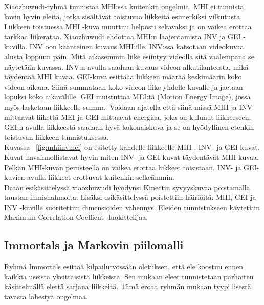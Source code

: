 Xiaozhuwudi-ryhmä tunnistaa MHI:ssa kuitenkin ongelmia. MHI ei tunnista kovin hyvin eleitä, jotka sisältävät toistuvaa liikkeitä esimerkiksi vilkutusta.
Liikkeen toistuessa MHI -kuva muuttuu helposti sekavaksi ja on vaikea erottaa tarkkaa liikerataa. Xiaozhuwudi ehdottaa MHI:n laajentamista INV ja GEI -kuvilla.
INV oon käänteinen kuvaus MHI:ille. INV:ssa katsotaan videokuvaa alusta loppuun päin.
Mitä aikasemmin liike esiintyy videolla sitä vaalempana se näytetään kuvassa. INV:n avulla saadaan kuvaus videon alkutilanteesta, mikä täydentää MHI kuvaa. 
GEI-kuva esittäää liikkeen määrää keskimäärin koko videon aikana. Siinä summataan koko videon liike yhdelle kuvalle ja jaetaan lopuksi koko aikavälille.
GEI muistuttaa MEI:tä (Motion Energy Image), jossa myös lasketaan liikkeelle summa. Voidaan ajatella että siinä missä MHI ja INV mittaavat liikettä 
MEI ja GEI mittaavat energiaa, joka on kulunut liikkeeseen. GEI:n avulla liikkeestä saadaan hyvä kokonaiskuva ja se on hyödyllinen etenkin toistuvan
liikkeen tunnistuksessa. \citep {6239179} \\

Kuvassa ~\ref{fig:mhiinvmei} on esitetty kahdelle
liikkeelle MHI-, INV- ja GEI-kuvat. Kuvat havainnollistavat hyvin miten INV- ja GEI-kuvat
täydentävät MHI-kuvaa. Pelkän MHI-kuvan perusteella on vaikea erottaa liikkeet toisistaan.
INV- ja GEI-kuvien avulla liikkeet erottuvat kuitenkin selkeämmin. \\

Datan esikäsittelyssä xiaozhuwudi hyödynsi Kinectin syvyyskuvaa poistamalla taustan ihmishahmolta. Lisäksi esikäsittelyssä poistettiin häiriöitä.
MHI, GEI ja INV -kuville suoritettiin dimensioiden vähennys. Eleiden tunnistukseen käytettiin Maximum Correlation Coeffient -luokittelijaa. \citep {6239179}\\



\subsection{Immortals ja Markovin piilomalli}

Ryhmä Immortals esittää kilpailutyössään oletuksen, että ele koostuu ennen kaikkia useista yksittäisistä liikkeistä. 
Sen mukaan eleet tunnistetaan parhaiten käsittelmällä elettä sarjana liikkeitä. Tämä eroaa ryhmän mukaan tyypillisestä 
tavasta lähestyä ongelmaa.\\

